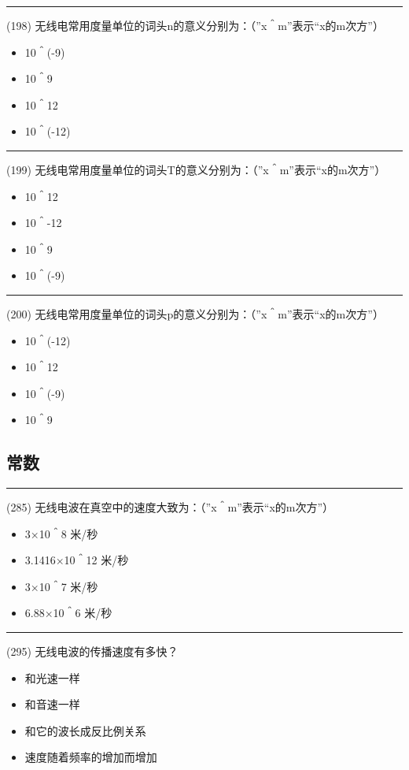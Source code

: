 \documentclass[twocolumn,hyperref,UTF8]{ctexart}  %
\begin{document}
\noindent\rule{0.5\textwidth}{1pt}
\heiti (198) 无线电常用度量单位的词头n的意义分别为：（”x＾m”表示“x的m次方”） \songti {\color{gray} [LK0471] }
\begin{itemize}
	\item  10＾(-9)
	\item  10＾9
	\item  10＾12
	\item  10＾(-12)
\end{itemize}


\noindent\rule{0.5\textwidth}{1pt}
\heiti (199) 无线电常用度量单位的词头T的意义分别为：（”x＾m”表示“x的m次方”） \songti {\color{gray} [LK0472] }
\begin{itemize}
	\item  10＾12
	\item  10＾-12
	\item  10＾9
	\item  10＾(-9)
\end{itemize}


\noindent\rule{0.5\textwidth}{1pt}
\heiti (200) 无线电常用度量单位的词头p的意义分别为：（”x＾m”表示“x的m次方”） \songti {\color{gray} [LK0473] }
\begin{itemize}
	\item  10＾(-12)
	\item  10＾12
	\item  10＾(-9)
	\item  10＾9
\end{itemize}



\clearpage
\subsection{常数}


\noindent\rule{0.5\textwidth}{1pt}
\heiti (285) 无线电波在真空中的速度大致为：（”x＾m”表示“x的m次方”） \songti {\color{gray} [LK0972] }
\begin{itemize}
	\item  3×10＾8 米/秒
	\item  3.1416×10＾12 米/秒
	\item  3×10＾7 米/秒
	\item  6.88×10＾6 米/秒
\end{itemize}


\noindent\rule{0.5\textwidth}{1pt}
\heiti (295) 无线电波的传播速度有多快？ \songti {\color{gray} [LK1109] }
\begin{itemize}
	\item  和光速一样
	\item  和音速一样
	\item  和它的波长成反比例关系
	\item  速度随着频率的增加而增加
\end{itemize}
\end{document}
